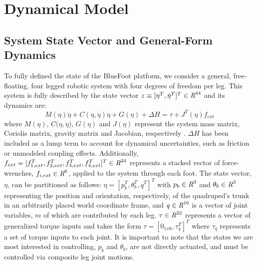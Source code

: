 	\section{Dynamical Model}
	

		\subsection{System State Vector and General-Form Dynamics}
		
			To fully defined the state of the BlueFoot platform, we consider a general, free-floating, four legged robotic system with four degrees of freedom per leg. This system is fully described by the state vector $z \equiv [\eta^{T}, \dot{\eta}^{T}]^{T} \in \emph{R}^{44}$ and its dynamics are:
				\begin{equation}
					M(\eta)\ddot{\eta} + C(\eta,\dot{\eta})\dot{\eta} + G(\eta) + \Delta{H} = \tau + J^T(\eta) f_{ext} %
					\label{eq::normal_form_dynamics}
				\end{equation}
			where $M(\eta)$, $C(\eta,\dot{\eta}$), $G(\eta)$ and $J(\eta)$ represent the system mass matrix, Coriolis matrix, gravity matrix and Jacobian, respectively \cite{Wieber2006}. $\Delta{H}$ has been included as a lump term to account for dynamical uncertainties, such as friction or unmodeled coupling effects. Additionally, $f_{ext} = [ f_{1,ext}^{T},f_{2,ext}^{T},f_{3,ext}^{T},f_{4,ext}^{T}]^{T} \in \emph{R}^{24}$ represents a stacked vector of force-wrenches, $f_{i,ext} \in \emph{R}^{6}$, applied to the system through each \Ith foot. The state vector, $\eta$, can be partitioned as follows: $\eta = [ {p}_{b}^{T}, \theta_{b}^{T}, q^{T} ]^{T}$ with ${p}_{b} \in \emph{R}^{3}$ and $\theta_{b} \in \emph{R}^{3}$ representing the position and orientation, respectively, of the quadruped's trunk in an arbitrarily placed world coordinate frame, and $q \in \emph{R}^{16}$ is a vector of joint variables, $m$ of which are contributed by each leg. $\tau \in \emph{R}^{22}$ represents a vector of generalized torque inputs and takes the form $\tau = [ 0_{1x6}, \tau_{q}^{T} ]^{T}$ where $\tau_{q}$ represents a set of torque inputs to each joint. It is important to note that the states we are most interested in controlling, ${p}_{b}$ and $\theta_{b}$, are not directly actuated, and must be controlled via composite leg joint motions.		


